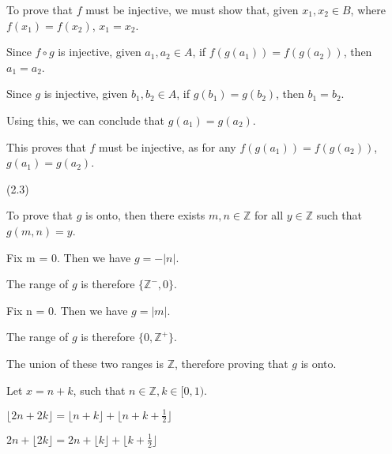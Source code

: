 \documentclass{exam}
\begin{document}
\begin{questions}
\begin{subparts}
\begin{center}
To prove that \(f\) must be injective, we must show that, given \(x_1, x_2 \in B\), where \(f(x_1) = f(x_2)\), \(x_1 = x_2\).

Since \(f \circ g\) is injective, given \(a_1, a_2 \in A\), if \(f(g(a_1)) = f(g(a_2))\), then \(a_1 = a_2\).

Since \(g\) is injective, given \(b_1, b_2 \in A\), if \(g(b_1) = g(b_2)\), then \(b_1 = b_2\).

Using this, we can conclude that \(g(a_1) = g(a_2)\).

This proves that \(f\) must be injective, as for any \(f(g(a_1)) = f(g(a_2))\), \(g(a_1) = g(a_2)\).

\end{center}

\end{subparts}

 (2.3)

\begin{center}

To prove that \(g\) is onto, then there exists \(m, n \in \mathbb{Z}\) for all \(y \in \mathbb{Z}\) such that \(g(m,n) = y\).

Fix m = 0. Then we have \(g = -|n|\).

The range of \(g\) is therefore \(\{\mathbb{Z^-}, 0\} \).

Fix n = 0. Then we have \(g = |m|\).

The range of \(g\) is therefore \(\{0, \mathbb{Z^+}\} \).

The union of these two ranges is \(\mathbb{Z}\), therefore proving that \(g\) is onto.

\end{center}

\begin{subparts}

\begin{center}

Let \(x = n + k\), such that \(n \in \mathbb{Z}, k \in [0, 1) \).

\( \lfloor 2n + 2k \rfloor = \lfloor n + k \rfloor + \lfloor n + k + \frac{1}{2} \rfloor \)

\( 2n + \lfloor 2k \rfloor = 2n + \lfloor k \rfloor + \lfloor k + \frac{1}{2} \rfloor \)
\vspace{5px}


\end{center}
\end{subparts}
\end{questions}
\end{document}
